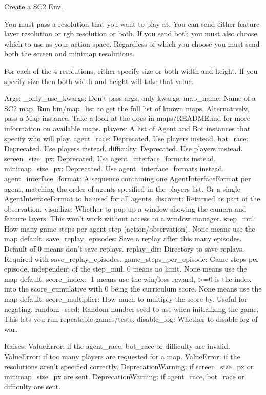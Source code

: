 \begin{DoxyVerb}Create a SC2 Env.

You must pass a resolution that you want to play at. You can send either
feature layer resolution or rgb resolution or both. If you send both you
must also choose which to use as your action space. Regardless of which you
choose you must send both the screen and minimap resolutions.

For each of the 4 resolutions, either specify size or both width and
height. If you specify size then both width and height will take that value.

Args:
  _only_use_kwargs: Don't pass args, only kwargs.
  map_name: Name of a SC2 map. Run bin/map_list to get the full list of
  known maps. Alternatively, pass a Map instance. Take a look at the
  docs in maps/README.md for more information on available maps.
  players: A list of Agent and Bot instances that specify who will play.
  agent_race: Deprecated. Use players instead.
  bot_race: Deprecated. Use players instead.
  difficulty: Deprecated. Use players instead.
  screen_size_px: Deprecated. Use agent_interface_formats instead.
  minimap_size_px: Deprecated. Use agent_interface_formats instead.
  agent_interface_format: A sequence containing one AgentInterfaceFormat
per agent, matching the order of agents specified in the players list.
Or a single AgentInterfaceFormat to be used for all agents.
  discount: Returned as part of the observation.
  visualize: Whether to pop up a window showing the camera and feature
  layers. This won't work without access to a window manager.
  step_mul: How many game steps per agent step (action/observation). None
  means use the map default.
  save_replay_episodes: Save a replay after this many episodes. Default of 0
  means don't save replays.
  replay_dir: Directory to save replays. Required with save_replay_episodes.
  game_steps_per_episode: Game steps per episode, independent of the
  step_mul. 0 means no limit. None means use the map default.
  score_index: -1 means use the win/loss reward, >=0 is the index into the
  score_cumulative with 0 being the curriculum score. None means use
  the map default.
  score_multiplier: How much to multiply the score by. Useful for negating.
  random_seed: Random number seed to use when initializing the game. This
  lets you run repeatable games/tests.
  disable_fog: Whether to disable fog of war.

Raises:
  ValueError: if the agent_race, bot_race or difficulty are invalid.
  ValueError: if too many players are requested for a map.
  ValueError: if the resolutions aren't specified correctly.
  DeprecationWarning: if screen_size_px or minimap_size_px are sent.
  DeprecationWarning: if agent_race, bot_race or difficulty are sent.
\end{DoxyVerb}
 


